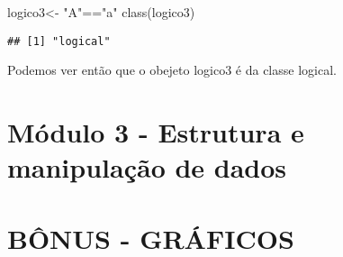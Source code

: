 \documentclass[
]{article}
\newenvironment{Shaded}{\begin{snugshade}}{\end{snugshade}}
\newcommand{\FunctionTok}[1]{\textcolor[rgb]{0.00,0.00,0.00}{#1}}
\newcommand{\NormalTok}[1]{#1}
\newcommand{\OtherTok}[1]{\textcolor[rgb]{0.56,0.35,0.01}{#1}}
\newcommand{\SpecialCharTok}[1]{\textcolor[rgb]{0.00,0.00,0.00}{#1}}
\newcommand{\StringTok}[1]{\textcolor[rgb]{0.31,0.60,0.02}{#1}}
\begin{document}
\begin{Shaded}
\begin{Highlighting}[]
\NormalTok{logico3}\OtherTok{\textless{}{-}} \StringTok{"A"}\SpecialCharTok{==}\StringTok{"a"}
\FunctionTok{class}\NormalTok{(logico3)}
\end{Highlighting}
\end{Shaded}

\begin{verbatim}
## [1] "logical"
\end{verbatim}

Podemos ver então que o obejeto logico3 é da classe logical.

\hypertarget{muxf3dulo-3---estrutura-e-manipulauxe7uxe3o-de-dados}{%
\section{Módulo 3 - Estrutura e manipulação de
dados}\label{muxf3dulo-3---estrutura-e-manipulauxe7uxe3o-de-dados}}

\hypertarget{buxf4nus---gruxe1ficos}{%
\section{BÔNUS - GRÁFICOS}\label{buxf4nus---gruxe1ficos}}
\end{document}
